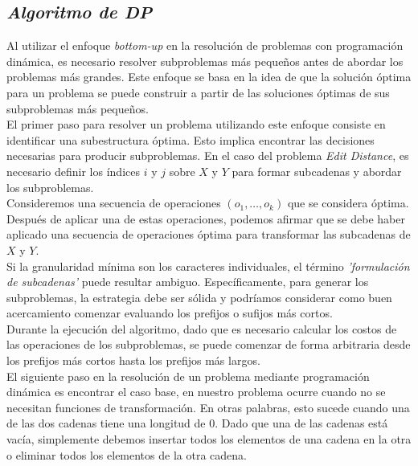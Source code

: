 \subsection{\textit{\textbf{Algoritmo de DP}}}

Al utilizar el enfoque \textit{bottom-up} en la resolución de problemas con programación dinámica, es necesario resolver subproblemas más pequeños antes de abordar los problemas más grandes. Este enfoque se basa en la idea de que la solución óptima para un problema se puede construir a partir de las soluciones óptimas de sus subproblemas más pequeños.\\

El primer paso para resolver un problema utilizando este enfoque consiste en identificar una subestructura óptima. Esto implica encontrar las decisiones necesarias para producir subproblemas. En el caso del problema \textit{Edit Distance}, es necesario definir los índices \(i\) y \(j\) sobre \(X\) y \(Y\)  para formar subcadenas y abordar los subproblemas.\\

Consideremos una secuencia de operaciones \((o_{1},\dots ,o_{k})\) que se considera óptima. Después de aplicar una de estas operaciones, podemos afirmar que se debe haber aplicado una secuencia de operaciones óptima para transformar las subcadenas de \(X\) y \(Y\).\\

Si la granularidad mínima son los caracteres individuales, el término \textit{'formulación de subcadenas'} puede resultar ambiguo. Específicamente, para generar los subproblemas, la estrategia debe ser sólida y podríamos considerar como buen acercamiento comenzar evaluando los prefijos o sufijos más cortos.\\

Durante la ejecución del algoritmo, dado que es necesario calcular los costos de las operaciones de los subproblemas, se puede comenzar de forma arbitraria desde los prefijos más cortos hasta los prefijos más largos.\\

El siguiente paso en la resolución de un problema mediante programación dinámica es encontrar el caso base, en nuestro problema ocurre cuando no se necesitan funciones de transformación. En otras palabras, esto sucede cuando una de las dos cadenas tiene una longitud de 0. Dado que una de las cadenas está vacía, simplemente debemos insertar todos los elementos de una cadena en la otra o eliminar todos los elementos de la otra cadena.\\


